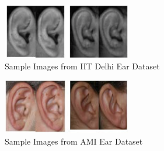 \begin{figure}
	\begin{center}
		\includegraphics[width=0.5\textwidth]{Figures/Figure13}
	\end{center}
	\caption{Sample Images from IIT Delhi Ear Dataset}
	\label{fig:Figure13}
\end{figure}

\begin{figure}
	\begin{center}
		\includegraphics[width=0.5\textwidth]{Figures/Figure14}
	\end{center}
	\caption{Sample Images from AMI Ear Dataset}
	\label{fig:Figure14}
\end{figure}